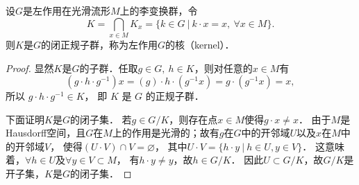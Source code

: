 \begin{theorem}\label{chlg:thm_subclosed}
    设$G$是左作用在光滑流形$M$上的李变换群，令
    \begin{equation}\label{chlg:eqn_clinvsub}
        K=\bigcap_{x\in M} K_x=\{k \in G \ |\ k \cdot x=x,\ \forall x \in M\}.
    \end{equation}
    则$K$是$G$的闭正规子群，称为左作用$G$的{\heiti 核}（kernel）．
\end{theorem}
\begin{proof}
    显然$K$是$G$的子群．任取$g \in G,\ h \in K$，则对任意的$x \in M$有
    \begin{equation}
        \left(g \cdot h \cdot g^{-1}\right) x  =(g) \cdot h \cdot\left(g^{-1} x\right) 
        =g \cdot\left(g^{-1} x\right) =x,
    \end{equation}
    所以 $g \cdot h \cdot g^{-1} \in K$， 即 $K$ 是 $G$ 的正规子群．
    
    下面证明$K$是$G$的闭子集． 若$g \in G / K$，则存在点$x \in M$使得$g\cdot x \neq x$．
    由于$M$是Hausdorff空间，且$G$在$M$上的作用是光滑的；故有$g$在$G$中的开邻域$U$以及$x$在$M$中的开邻域$V$，
    使得$(U \cdot V) \cap V=\varnothing$，
    其中$U \cdot V=\{h \cdot y \ |\ h \in U, y \in V\}$．
    这意味着，$\forall h \in U$及$\forall y \in V\subset M$，
    有$h \cdot y \neq y$，故$h \in G / K$．
    因此$U \subset G / K$，故$G / K$是开子集，$K$是$G$的闭子集．
\end{proof}



